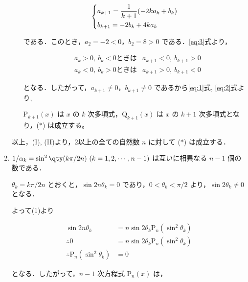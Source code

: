 \documentclass[a4paper]{ltjsarticle}
\begin{document}
\begin{enumerate}[label=(\arabic*)]
\begin{enumerate}[label=(\Roman*)]
                    \begin{equation}
                        \begin{dcases}
                            a_{k+1}=\dfrac{1}{k+1}(-2ka_k+b_k) \\
                            b_{k+1}=-2b_k+4ka_k
                        \end{dcases}\label{eq:3}
                    \end{equation}

                    である．このとき，$a_2=-2<0$，$b_2=8>0$ である．\eqref{eq:3}式より，

                    \begin{align*}
                         & a_k>0,\ b_k<0\text{ときは} & a_{k+1}<0,\ b_{k+1}>0 \\
                         & a_k<0,\ b_k>0\text{ときは} & a_{k+1}>0,\ b_{k+1}<0
                    \end{align*}

                    となる．したがって，$a_{k+1}\neq 0$，$b_{k+1}\neq 0$ であるから\eqref{eq:1}式, \eqref{eq:2}式より,

                    $\mathrm{P}_{k+1}(x)$ は $x$ の $k$ 次多項式，$\mathrm{Q}_{k+1}(x)$ は $x$ の $k+1$ 次多項式となり，($\ast$) は成立する。
          \end{enumerate}

          以上，(I), (II)より，2以上の全ての自然数 $n$ に対して ($\ast$) は成立する．

    \item $1/\alpha_k=\sin^2\qty(k\pi/2n)\ (k=1, 2, \cdots, n-1)$ は互いに相異なる $n-1$ 個の数である．

          $\theta_k=k\pi/2n$ とおくと，$\sin2n\theta_k=0$ であり，$0<\theta_k<\pi/2$ より，$\sin2\theta_k\neq0$ となる．

          よって(1)より

          \begin{align*}
              \sin 2n\theta_k                         & =n\sin{2\theta_k}\mathrm{P}_n(\sin^2\theta_k) \\
              \therefore 0                            & =n\sin{2\theta_k}\mathrm{P}_n(\sin^2\theta_k) \\
              \therefore \mathrm{P}_n(\sin^2\theta_k) & =0
          \end{align*}

          となる．したがって，$n-1$ 次方程式 $\mathrm{P}_n(x)$ は，


\end{enumerate}
\end{document}
